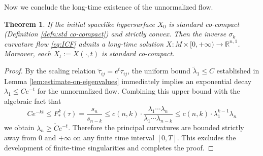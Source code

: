 \documentclass[reqno]{amsart}
\newtheorem{theorem}{Theorem}[section]
\theoremstyle{remark}
\newcommand{\R}{\ensuremath{\mathbb{R}}}
\theoremstyle{definition}
\numberwithin{equation}{section}
\begin{document}
Now we conclude the long-time existence of the unnormalized flow. 
\begin{theorem}\label{thm:long-time}
    If the initial spacelike hypersurface \(X_0\) is standard co-compact (Definition \ref{defn:std co-compact}) and strictly convex. Then the inverse \(\sigma_k\) curvature flow \eqref{eq:ICF} admits a long-time solution \(X: M\times [0,+\infty) \to \R^{n,1}\). Moreover, each \(X_t := X(\cdot, t)\) is standard co-compact.
\end{theorem}
\begin{proof}
    By the scaling relation $\tilde{\tau}_{ij} = e^t \tau_{ij}$, the uniform bound $\tilde{\lambda}_1 \leq C$ established in Lemma \ref{lem:estimate-on-eigenvalues} immediately implies an exponential decay $\lambda_1 \leq C e^{-t}$ for the unnormalized flow. Combining this upper bound with the algebraic fact that 
    \[ Ce^{-kt} \leq F^k_*(\tau) = \frac{s_n}{s_{n-k}} \leq c(n,k)\cdot \frac{\lambda_1\cdots\lambda_n}{\lambda_1 \cdots \lambda_{n-k}} \leq c(n,k)\cdot \lambda_1^{k-1}\lambda_n \]
    we obtain \(\lambda_n \geq \tilde{C} e^{-t}\). 
    Therefore the principal curvatures are bounded strictly away from $0$ and $+\infty$ on any finite time interval $[0, T]$. This excludes the development of finite-time singularities and completes the proof. 
\end{proof}
\end{document}
